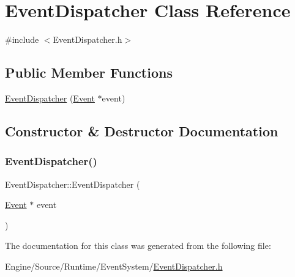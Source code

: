 \hypertarget{class_event_dispatcher}{}\section{Event\+Dispatcher Class Reference}
\label{class_event_dispatcher}


{\ttfamily \#include $<$Event\+Dispatcher.\+h$>$}

\subsection*{Public Member Functions}
\begin{DoxyCompactItemize}
\item 
\mbox{\hyperlink{class_event_dispatcher_a4230d150965d1bdf1552b60ea3f6a64a}{Event\+Dispatcher}} (\mbox{\hyperlink{class_event}{Event}} $\ast$event)
\end{DoxyCompactItemize}


\subsection{Constructor \& Destructor Documentation}
\mbox{\label{class_event_dispatcher_a4230d150965d1bdf1552b60ea3f6a64a}} 
\subsubsection{\texorpdfstring{Event\+Dispatcher()}{EventDispatcher()}}
{\footnotesize\ttfamily Event\+Dispatcher\+::\+Event\+Dispatcher (\begin{DoxyParamCaption}\item[{\mbox{\hyperlink{class_event}{Event}} $\ast$}]{event }\end{DoxyParamCaption})\hspace{0.3cm}{\ttfamily [inline]}}



The documentation for this class was generated from the following file\+:\begin{DoxyCompactItemize}
\item 
Engine/\+Source/\+Runtime/\+Event\+System/\mbox{\hyperlink{_event_dispatcher_8h}{Event\+Dispatcher.\+h}}\end{DoxyCompactItemize}
